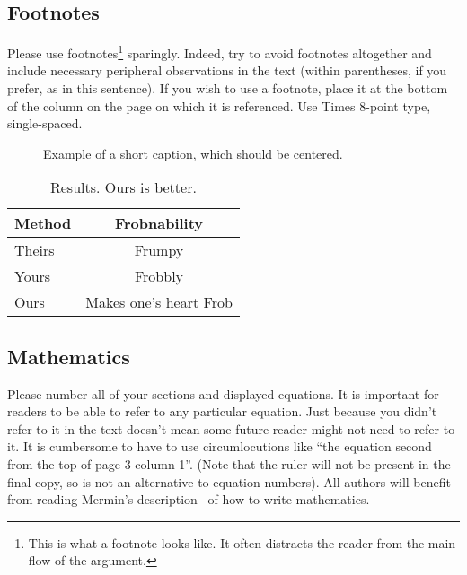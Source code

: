 \documentclass{bmvc2k}
\begin{document}
\subsection{Footnotes}

Please use footnotes\footnote {This is what a footnote looks like.  It
often distracts the reader from the main flow of the argument.} sparingly.
Indeed, try to avoid footnotes altogether and include necessary peripheral
observations in
the text (within parentheses, if you prefer, as in this sentence).  If you
wish to use a footnote, place it at the bottom of the column on the page on
which it is referenced. Use Times 8-point type, single-spaced.


\begin{figure*}
\begin{center}
\fbox{\rule{0pt}{2in} \rule{.9\linewidth}{0pt}}
\end{center}
   \caption{Example of a short caption, which should be centered.}
\label{fig:short}
\end{figure*}

\begin{table}
\begin{center}
\begin{tabular}{|l|c|}
\hline
Method & Frobnability \\
\hline\hline
Theirs & Frumpy \\
Yours & Frobbly \\
Ours & Makes one's heart Frob\\
\hline
\end{tabular}
\end{center}
\caption{Results.   Ours is better.}
\end{table}

\subsection{Mathematics}

Please number all of your sections and displayed equations.  It is
important for readers to be able to refer to any particular equation.  Just
because you didn't refer to it in the text doesn't mean some future reader
might not need to refer to it.  It is cumbersome to have to use
circumlocutions like ``the equation second from the top of page 3 column
1''.  (Note that the ruler will not be present in the final copy, so is not
an alternative to equation numbers).  All authors will benefit from reading
Mermin's description~\cite{Mermin89} of how to write mathematics.
\end{document}
